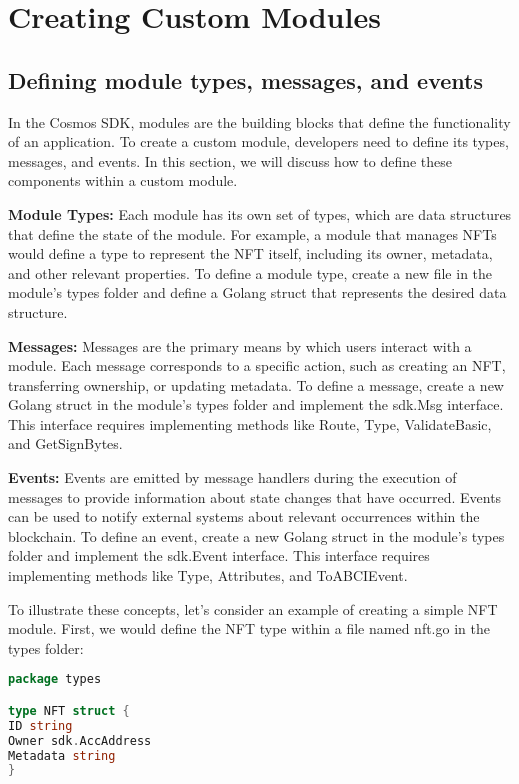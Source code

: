 \documentclass{article}
\begin{document}
%
%
\section{Creating Custom Modules}
%
\subsection{Defining module types, messages, and events}

In the Cosmos SDK, modules are the building blocks that define the functionality of an application. To create a custom module, developers need to define its types, messages, and events. In this section, we will discuss how to define these components within a custom module.

\textbf{Module Types:} Each module has its own set of types, which are data structures that define the state of the module. For example, a module that manages NFTs would define a type to represent the NFT itself, including its owner, metadata, and other relevant properties. To define a module type, create a new file in the module's types folder and define a Golang struct that represents the desired data structure.

\textbf{Messages:} Messages are the primary means by which users interact with a module. Each message corresponds to a specific action, such as creating an NFT, transferring ownership, or updating metadata. To define a message, create a new Golang struct in the module's types folder and implement the sdk.Msg interface. This interface requires implementing methods like Route, Type, ValidateBasic, and GetSignBytes.

\textbf{Events:} Events are emitted by message handlers during the execution of messages to provide information about state changes that have occurred. Events can be used to notify external systems about relevant occurrences within the blockchain. To define an event, create a new Golang struct in the module's types folder and implement the sdk.Event interface. This interface requires implementing methods like Type, Attributes, and ToABCIEvent.

To illustrate these concepts, let's consider an example of creating a simple NFT module. First, we would define the NFT type within a file named nft.go in the types folder:

\begin{lstlisting}[language=Go]
package types

type NFT struct {
ID string
Owner sdk.AccAddress
Metadata string
}
\end{lstlisting}
\end{document}
